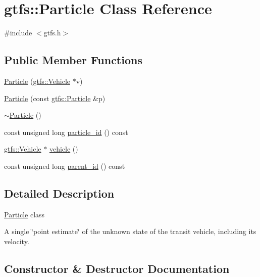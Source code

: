 \hypertarget{classgtfs_1_1Particle}{}\section{gtfs\+:\+:Particle Class Reference}
\label{classgtfs_1_1Particle}


{\ttfamily \#include $<$gtfs.\+h$>$}

\subsection*{Public Member Functions}
\begin{DoxyCompactItemize}
\item 
\hyperlink{classgtfs_1_1Particle_a0d9725e1cf30d868fd0a7a1a6c841e53}{Particle} (\hyperlink{classgtfs_1_1Vehicle}{gtfs\+::\+Vehicle} $\ast$v)
\item 
\hyperlink{classgtfs_1_1Particle_a9b2546360867281901bed0f731b90153}{Particle} (const \hyperlink{classgtfs_1_1Particle}{gtfs\+::\+Particle} \&p)
\item 
\hyperlink{classgtfs_1_1Particle_a3accf3496ad8460b4ad8b3f6da2de411}{$\sim$\+Particle} ()
\item 
const unsigned long \hyperlink{classgtfs_1_1Particle_a4c02d3ea318b8f88c30a6fa32dc7f727}{particle\+\_\+id} () const 
\item 
\hyperlink{classgtfs_1_1Vehicle}{gtfs\+::\+Vehicle} $\ast$ \hyperlink{classgtfs_1_1Particle_a163b07fa0c6a576fa7f21e7eb1efa572}{vehicle} ()
\item 
const unsigned long \hyperlink{classgtfs_1_1Particle_aae0765ce4fcd86b55be0395ba468a64e}{parent\+\_\+id} () const 
\end{DoxyCompactItemize}


\subsection{Detailed Description}
\hyperlink{classgtfs_1_1Particle}{Particle} class

A single \char`\"{}point estimate\char`\"{} of the unknown state of the transit vehicle, including its velocity. 

\subsection{Constructor \& Destructor Documentation}
